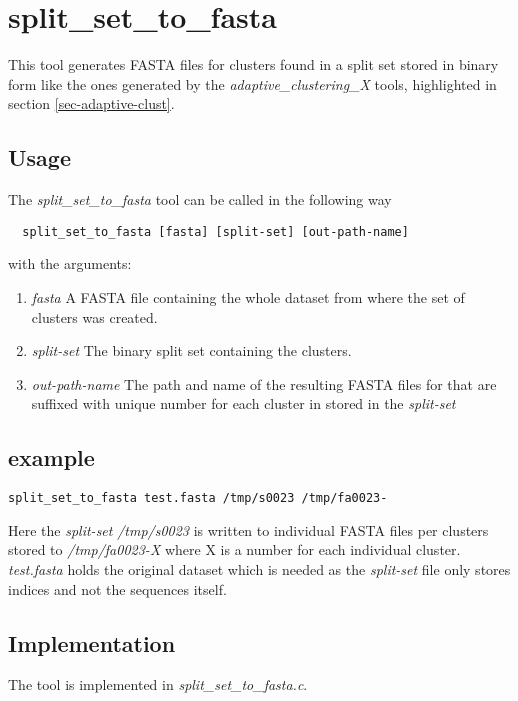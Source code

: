 \section{split\_set\_to\_fasta} \label{sec-sstofasta}

This tool generates FASTA files for clusters found in a split set stored in
binary form like the ones generated by the
\emph{adaptive\_clustering\_X} tools, highlighted in section
\ref{sec-adaptive-clust}.

\subsection{Usage}
The \emph{split\_set\_to\_fasta} tool can be called in the following way
\begin{lstlisting}
  split_set_to_fasta [fasta] [split-set] [out-path-name]
\end{lstlisting}
with the arguments:
\begin{enumerate}
  \item \emph{fasta} A FASTA file containing the whole dataset from
    where the set of clusters was created.
  \item \emph{split-set} The binary split set containing the
    clusters.
  \item \emph{out-path-name} The path and name of the resulting FASTA
    files for that are suffixed with unique number for each cluster in
    stored in the \emph{split-set}
\end{enumerate}

\subsection{example}
\begin{lstlisting}
split_set_to_fasta test.fasta /tmp/s0023 /tmp/fa0023-
\end{lstlisting}
Here the \emph{split-set} \emph{/tmp/s0023} is written to individual
FASTA files per clusters stored to
\emph{/tmp/fa0023-X} where X is a number for each individual cluster.
\emph{test.fasta} holds the original dataset
which is needed as the \emph{split-set} file only stores indices and
not the sequences itself.

\subsection{Implementation}
The tool is implemented in \emph{split\_set\_to\_fasta.c}. 
